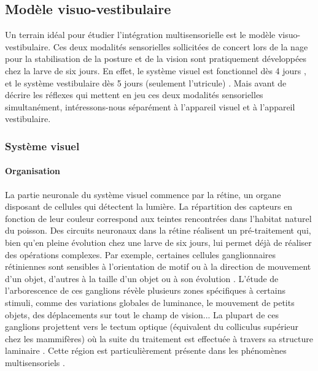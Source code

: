 


\subsection{Modèle visuo-vestibulaire}

Un terrain idéal pour étudier l'intégration multisensorielle est le modèle visuo-vestibulaire. Ces deux modalités sensorielles sollicitées de concert lors de la nage pour la stabilisation de la posture et de la vision sont pratiquement développées chez la larve de six jours. En effet, le système visuel est fonctionnel dès 4 jours \cite{bollmann_zebrafish_2019}, et le système vestibulaire dès 5 jours (seulement l'utricule) \cite{haddon_early_1996}. Mais avant de décrire les réflexes qui mettent en jeu ces deux modalités sensorielles simultanément, intéressons-nous séparément à l'appareil visuel et à l'appareil vestibulaire.

\subsubsection{Système visuel}

\paragraph{Organisation}
La partie neuronale du système visuel commence par la rétine, un organe disposant de cellules qui détectent la lumière. La répartition des capteurs en fonction de leur couleur correspond aux teintes rencontrées dans l'habitat naturel du poisson. Des circuits neuronaux dans la rétine réalisent un pré-traitement qui, bien qu'en pleine évolution chez une larve de six jours, lui permet déjà de réaliser des opérations complexes. Par exemple, certaines cellules ganglionnaires rétiniennes sont sensibles à l'orientation de motif ou à la direction de mouvement d'un objet, d'autres à la taille d'un objet ou à son évolution \cite{bollmann_zebrafish_2019}. L'étude de l'arborescence de ces ganglions révèle plusieurs zones spécifiques à certains stimuli, comme des variations globales de luminance, le mouvement de petits objets, des déplacements sur tout le champ de vision... La plupart de ces ganglions projettent vers le tectum optique (équivalent du colliculus supérieur chez les mammifères) où la suite du traitement est effectuée à travers sa structure laminaire \cite{portugues_neural_2009}. Cette région est particulièrement présente dans les phénomènes multisensoriels \cite{meredith_interactions_1983}.

